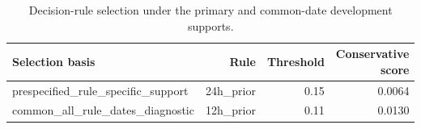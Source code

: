 \begin{table}[htbp]
\centering
\caption{Decision-rule selection under the primary and common-date development supports.}
\label{tab:rule-support-robustness}
\begin{tabular}{lrrr}
\toprule
Selection basis & Rule & Threshold & Conservative score \\
\midrule
prespecified\_rule\_specific\_support & 24h\_prior & 0.15 & 0.0064 \\
common\_all\_rule\_dates\_diagnostic & 12h\_prior & 0.11 & 0.0130 \\
\bottomrule
\end{tabular}
\end{table}
